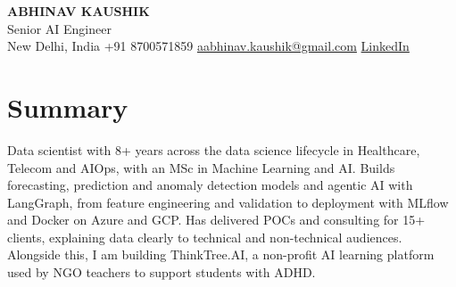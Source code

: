 \documentclass[10pt,a4paper]{article}
\begin{document}
\begin{center}
  {\LARGE\bfseries ABHINAV KAUSHIK}\\[2pt]
  {\large Senior AI Engineer}\\[2pt]
  New Delhi, India \textbar{} +91 8700571859 \textbar{} \href{mailto:aabhinav.kaushik@gmail.com}{aabhinav.kaushik@gmail.com} \textbar{} \href{https://www.linkedin.com/in/abhinav-kaushik10/}{LinkedIn}  
\end{center}

\section{Summary}
Data scientist with 8+ years across the data science lifecycle in Healthcare, Telecom and AIOps, with an MSc in Machine Learning and AI. Builds forecasting, prediction and anomaly detection models and agentic AI with LangGraph, from feature engineering and validation to deployment with MLflow and Docker on Azure and GCP. Has delivered POCs and consulting for 15+ clients, explaining data clearly to technical and non-technical audiences. Alongside this, I am building ThinkTree.AI, a non-profit AI learning platform used by NGO teachers to support students with ADHD.
\end{document}
